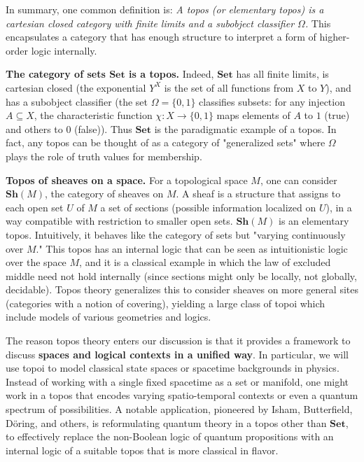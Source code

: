 \vspace{1em}
In summary, one common definition is: \emph{A topos (or elementary topos) is a cartesian closed category with finite limits and a subobject classifier $\Omega$.} This encapsulates a category that has enough structure to interpret a form of higher-order logic internally.

\vspace{1em}
\begin{example}\label{ex:Set-topos}
\textbf{The category of sets $\mathbf{Set}$ is a topos.} Indeed, $\mathbf{Set}$ has all finite limits, is cartesian closed (the exponential $Y^X$ is the set of all functions from $X$ to $Y$), and has a subobject classifier (the set $\Omega = \{0,1\}$ classifies subsets: for any injection $A \subseteq X$, the characteristic function $\chi: X \to \{0,1\}$ maps elements of $A$ to $1$ (true) and others to $0$ (false)). Thus $\mathbf{Set}$ is the paradigmatic example of a topos. In fact, any topos can be thought of as a category of "generalized sets" where $\Omega$ plays the role of truth values for membership.
\end{example}

\vspace{1em}
\begin{example}\label{ex:Sh-topos}
\textbf{Topos of sheaves on a space.} For a topological space $M$, one can consider $\mathbf{Sh}(M)$, the category of sheaves on $M$. A sheaf is a structure that assigns to each open set $U$ of $M$ a set of sections (possible information localized on $U$), in a way compatible with restriction to smaller open sets. $\mathbf{Sh}(M)$ is an elementary topos. Intuitively, it behaves like the category of sets but "varying continuously over $M$." This topos has an internal logic that can be seen as intuitionistic logic over the space $M$, and it is a classical example in which the law of excluded middle need not hold internally (since sections might only be locally, not globally, decidable). Topos theory generalizes this to consider sheaves on more general sites (categories with a notion of covering), yielding a large class of topoi which include models of various geometries and logics.
\end{example}

\vspace{1em}
The reason topos theory enters our discussion is that it provides a framework to discuss \textbf{spaces and logical contexts in a unified way}. In particular, we will use topoi to model classical state spaces or spacetime backgrounds in physics. Instead of working with a single fixed spacetime as a set or manifold, one might work in a topos that encodes varying spatio-temporal contexts or even a quantum spectrum of possibilities. A notable application, pioneered by Isham, Butterfield, Döring, and others, is reformulating quantum theory in a topos other than $\mathbf{Set}$, to effectively replace the non-Boolean logic of quantum propositions with an internal logic of a suitable topos that is more classical in flavor.

